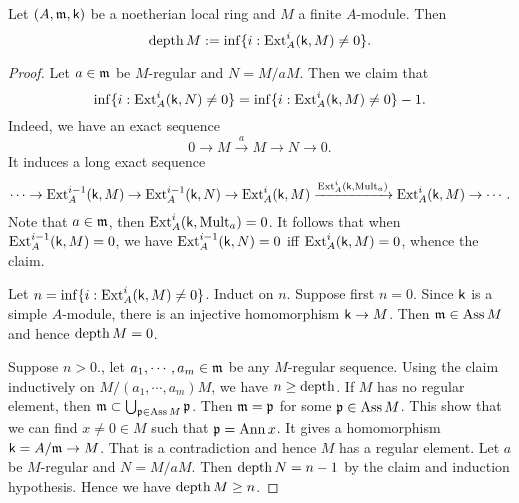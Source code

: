     \begin{proposition}\label{prop: depth equals to grade}
        Let $(A, {\mathfrak{m}}, {\mathsf{k}})$ be a noetherian local ring and $M$ a finite $A$-module.
        Then 
        \[ \operatorname{depth} M := \inf \{ i : \operatorname{Ext}^i_A({\mathsf{k}},M) \neq 0 \}. \]
    \end{proposition}
    \begin{proof}
        Let $a \in {\mathfrak{m}}$ be $M$-regular and $N = M/aM$.
        Then we claim that
        \[ \inf \{ i: \operatorname{Ext}^i_A({\mathsf{k}},N) \neq 0 \} = \inf \{ i : \operatorname{Ext}^i_A({\mathsf{k}},M) \neq 0 \} - 1. \]
        Indeed, we have an exact sequence
        \[ 0 \to M \xrightarrow{a} M \to N \to 0. \]
        It induces a long exact sequence
        \[ \cdots \to \operatorname{Ext}^{i-1}_A({\mathsf{k}},M) \to \operatorname{Ext}^{i-1}_A({\mathsf{k}},N) \to \operatorname{Ext}^i_A({\mathsf{k}},M) \xrightarrow{\operatorname{Ext}^i_A({\mathsf{k}},\operatorname{Mult}_a)} \operatorname{Ext}^i_A({\mathsf{k}},M) \to \cdots. \]
        Note that $a \in {\mathfrak{m}}$, then $\operatorname{Ext}^i_A({\mathsf{k}},\operatorname{Mult}_a) = 0$.
        It follows that when $\operatorname{Ext}^{i-1}_A({\mathsf{k}},M) = 0$, we have $\operatorname{Ext}^{i-1}_A({\mathsf{k}},N) = 0$ iff $\operatorname{Ext}^i_A({\mathsf{k}},M) = 0$, whence the claim.

        Let $n = \inf \{ i : \operatorname{Ext}^i_A({\mathsf{k}},M) \neq 0 \}$.
        Induct on $n$.
        Suppose first $n = 0$.
        Since ${\mathsf{k}}$ is a simple $A$-module, there is an injective homomorphism ${\mathsf{k}} \to M$.
        Then ${\mathfrak{m}} \in \operatorname{Ass} M$ and hence $\operatorname{depth} M = 0$.
        
        Suppose $n > 0$., let $a_1,\cdots,a_m \in {\mathfrak{m}}$ be any $M$-regular sequence.
        Using the claim inductively on $M/(a_1,\cdots,a_m)M$, we have $n \geq \operatorname{depth}$.
        If $M$ has no regular element, then ${\mathfrak{m}} \subset \bigcup_{{\mathfrak{p}} \in \operatorname{Ass} M} {\mathfrak{p}}$.
        Then ${\mathfrak{m}} = {\mathfrak{p}}$ for some ${\mathfrak{p}} \in \operatorname{Ass} M$.
        This show that we can find $x \neq 0 \in M$ such that ${\mathfrak{p}} = \operatorname{Ann} x$.
        It gives a homomorphism ${\mathsf{k}} = A/{\mathfrak{m}} \to M$.
        That is a contradiction and hence $M$ has a regular element.
        Let $a$ be $M$-regular and $N = M/aM$.
        Then $\operatorname{depth} N = n-1$ by the claim and induction hypothesis.
        Hence we have $\operatorname{depth} M \geq n$.
    \end{proof}

